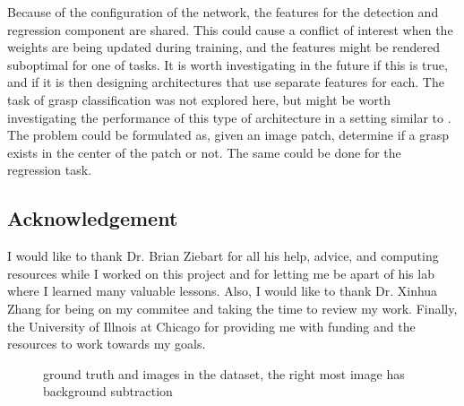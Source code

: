 \documentclass{article}
\begin{document}
Because of the configuration of the network, the features for the detection
and regression component are shared. This could cause a conflict of interest
when the weights are being updated during training, and the features might
be rendered suboptimal for one of tasks. It is worth investigating in the
future if this is true, and if it is then designing architectures that
use separate features for each. The task of grasp classification was
not explored here, but might be worth investigating the performance of
this type of architecture in a setting similar to \cite{saxena08a}. The
problem could be formulated as, given an image patch, determine if a
grasp exists in the center of the patch or not. The same could be done
for the regression task.

\subsection{Acknowledgement}
I would like to thank Dr. Brian Ziebart for all his help, advice,
and computing resources while I worked on this project and
for letting me be apart of his lab where I learned many valuable
lessons. Also,
I would like to thank Dr. Xinhua Zhang for being on my commitee
and taking the time to review my work. Finally, the
University of Illnois at Chicago for providing me with funding
and the resources to work towards my goals.

\begin{figure}
\centering
{}
\caption{ground truth and images in the dataset, the right most image has background subtraction}
\end{figure}
\end{document}
